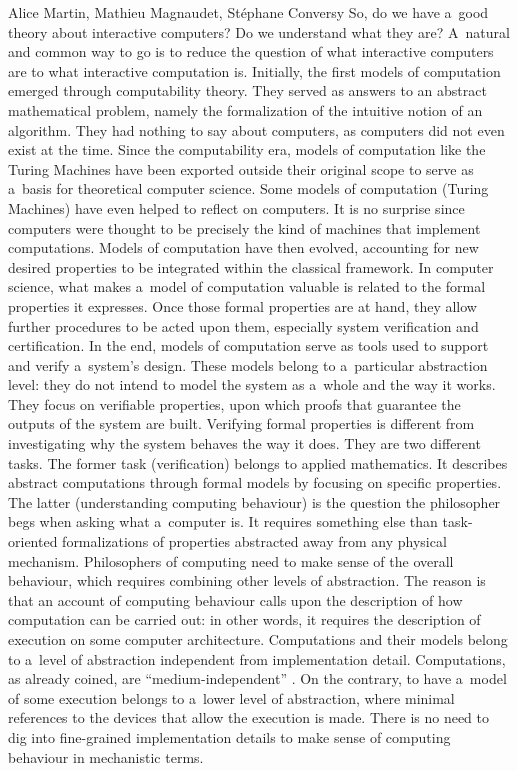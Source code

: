 \begin{artengenv2auth}{Alice Martin, Mathieu Magnaudet, Stéphane Conversy}
So, do we have a~good theory about interactive computers? Do we understand what they are? A~natural and common way to go is to reduce the question of what interactive computers are to what interactive computation is. Initially, the first models of computation emerged through computability theory. They served as answers to an abstract mathematical problem, namely the formalization of the intuitive notion of an algorithm. They had nothing to say about computers, as computers did not even exist at the time. Since the computability era, models of computation like the Turing Machines have been exported outside their original scope to serve as a~basis for theoretical computer science. Some models of computation (Turing Machines) have even helped to reflect on computers. It is no surprise since computers were thought to be precisely the kind of machines that implement computations. Models of computation have then evolved, accounting for new desired properties to be integrated within the classical framework. In computer science, what makes a~model of computation valuable is related to the formal properties it expresses. Once those formal properties are at hand, they allow further procedures to be acted upon them, especially system verification and certification.  In the end, models of computation serve as tools used to support and verify a~system’s design. These models belong to a~particular abstraction level: they do not intend to model the system as a~whole and the way it works. They focus on verifiable properties, upon which proofs that guarantee the outputs of the system are built. Verifying formal properties is different from investigating why the system behaves the way it does. They are two different tasks. The former task (verification) belongs to applied mathematics. It describes abstract computations through formal models by focusing on specific properties. The latter (understanding computing behaviour) is the question the philosopher begs when asking what a~computer is. It requires something else than task-oriented formalizations of properties abstracted away from any physical mechanism. Philosophers of computing need to make sense of the overall behaviour, which requires combining other levels of abstraction.  The reason is that an account of computing behaviour calls upon the description of how computation can be carried out: in other words, it requires the description of execution on some computer architecture.
Computations and their models belong to a~level of abstraction independent from implementation detail. Computations, as already coined, are ``medium-independent'' \parencite{Klein2020}. On the contrary, to have a~model of some execution belongs to a~lower level of abstraction, where minimal references to the devices that allow the execution is made. There is no need to dig into fine-grained implementation details to make sense of computing behaviour in mechanistic terms.


\end{artengenv2auth}
